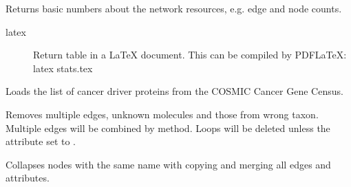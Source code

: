 \documentclass[letterpaper,10pt,english]{sphinxmanual}
\begin{document}
\begin{fulllineitems}

\begin{fulllineitems}
\label{\detokenize{main:pypath.main.PyPath.basic_stats}}
Returns basic numbers about the network resources, e.g. edge and
node counts.
\begin{description}
\item[{latex}] \leavevmode
Return table in a LaTeX document. This can be compiled by
PDFLaTeX:
latex stats.tex

\end{description}

\end{fulllineitems}


\begin{fulllineitems}
\label{\detokenize{main:pypath.main.PyPath.cancer_gene_census_list}}
Loads the list of cancer driver proteins from the COSMIC Cancer
Gene Census.

\end{fulllineitems}


\begin{fulllineitems}
\label{\detokenize{main:pypath.main.PyPath.clean_graph}}
Removes multiple edges, unknown molecules and those from wrong taxon.
Multiple edges will be combined by  method.
Loops will be deleted unless the  attribute set to .

\end{fulllineitems}


\begin{fulllineitems}
\label{\detokenize{main:pypath.main.PyPath.collapse_by_name}}
Collapses nodes with the same name with copying and merging
all edges and attributes.


\end{fulllineitems}
\end{fulllineitems}
\end{document}
